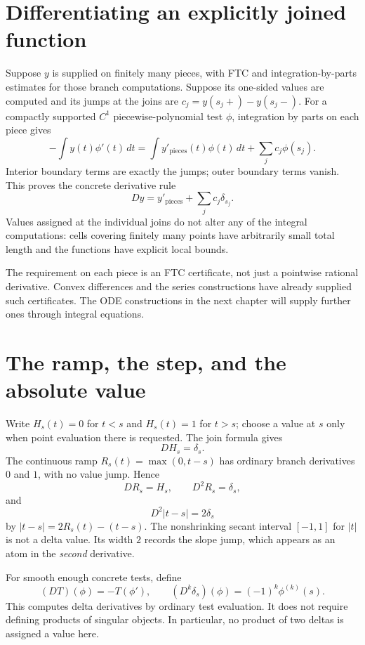 \section{Differentiating an explicitly joined function}
Suppose $y$ is supplied on finitely many pieces, with FTC and
integration-by-parts estimates for those branch computations.  Suppose its
one-sided values are computed and its jumps at the joins are
$c_j=y(s_j+)-y(s_j-)$.  For a compactly supported $C^1$ piecewise-polynomial
test $\phi$, integration by parts on each piece gives
\[
 -\int y(t)\phi'(t)\,dt
   =\int y'_{\mathrm{pieces}}(t)\phi(t)\,dt
      +\sum_jc_j\phi(s_j).
\]
Interior boundary terms are exactly the jumps; outer boundary terms vanish.
This proves the concrete derivative rule
\[
 \boxed{Dy=y'_{\mathrm{pieces}}+\sum_jc_j\delta_{s_j}.}
\]
Values assigned at the individual joins do not alter any of the integral
computations: cells covering finitely many points have arbitrarily small
total length and the functions have explicit local bounds.

The requirement on each piece is an FTC certificate, not just a pointwise
rational derivative.  Convex differences and the series constructions have
already supplied such certificates.  The ODE constructions in the next
chapter will supply further ones through integral equations.

\section{The ramp, the step, and the absolute value}
Write $H_s(t)=0$ for $t<s$ and $H_s(t)=1$ for $t>s$; choose a value at
$s$ only when point evaluation there is requested.  The join formula gives
\[
 DH_s=\delta_s.
\]
The continuous ramp $R_s(t)=\max(0,t-s)$ has ordinary branch derivatives
$0$ and $1$, with no value jump.  Hence
\[
 DR_s=H_s,\qquad D^2R_s=\delta_s,
\]
and
\[
 \boxed{D^2|t-s|=2\delta_s}
\]
by $|t-s|=2R_s(t)-(t-s)$.  The nonshrinking secant interval $[-1,1]$
for $|t|$ is not a delta value.  Its width $2$ records the slope jump,
which appears as an atom in the \emph{second} derivative.

For smooth enough concrete tests, define
\[
 (DT)(\phi)=-T(\phi'),\qquad
 (D^k\delta_s)(\phi)=(-1)^k\phi^{(k)}(s).
\]
This computes delta derivatives by ordinary test evaluation.  It does not
require defining products of singular objects.  In particular, no product
of two deltas is assigned a value here.

